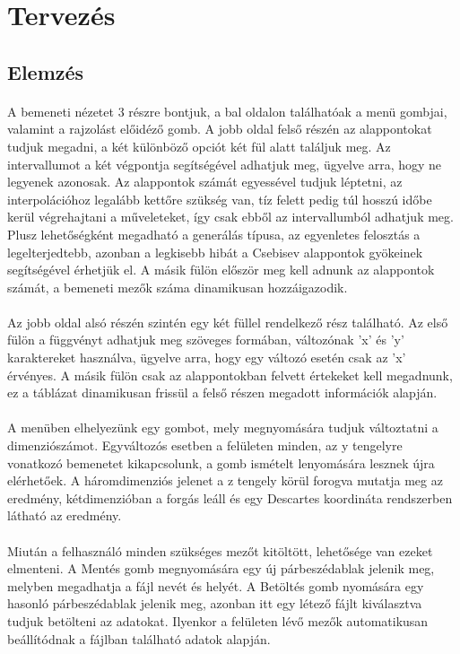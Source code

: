 \documentclass[12pt]{report}
\begin{document}
\section{Tervezés}
\subsection{Elemzés}
\paragraph{}
A bemeneti nézetet 3 részre bontjuk, a bal oldalon találhatóak a menü gombjai, valamint a rajzolást előidéző gomb. A jobb oldal felső részén az alappontokat tudjuk megadni, a két különböző opciót két fül alatt találjuk meg. Az intervallumot a két végpontja segítségével adhatjuk meg, ügyelve arra, hogy ne legyenek azonosak. Az alappontok számát egyessével tudjuk léptetni, az interpolációhoz legalább kettőre szükség van, tíz felett pedig túl hosszú időbe kerül végrehajtani a műveleteket, így csak ebből az intervallumból adhatjuk meg. Plusz lehetőségként megadható a generálás típusa, az egyenletes felosztás a legelterjedtebb, azonban a legkisebb hibát a Csebisev alappontok gyökeinek segítségével érhetjük el. A másik fülön először meg kell adnunk az alappontok számát, a bemeneti mezők száma dinamikusan hozzáigazodik.
\paragraph{}
Az jobb oldal alsó részén szintén egy két füllel rendelkező rész található. Az első fülön a függvényt adhatjuk meg szöveges formában, változónak 'x' és 'y' karaktereket használva, ügyelve arra, hogy egy változó esetén csak az 'x' érvényes. A másik fülön csak az alappontokban felvett értekeket kell megadnunk, ez a táblázat dinamikusan frissül a felső részen megadott információk alapján.
\paragraph{}
A menüben elhelyezünk egy gombot, mely megnyomására tudjuk változtatni a dimenziószámot. Egyváltozós esetben a felületen minden, az y tengelyre vonatkozó bemenetet kikapcsolunk, a gomb ismételt lenyomására lesznek újra elérhetőek. A háromdimenziós jelenet a z tengely körül forogva mutatja meg az eredmény, kétdimenzióban a forgás leáll és egy Descartes koordináta rendszerben látható az eredmény.
\paragraph{}
Miután a felhasználó minden szükséges mezőt kitöltött, lehetősége van ezeket elmenteni. A Mentés gomb megnyomására egy új párbeszédablak jelenik meg, melyben megadhatja a fájl nevét és helyét. A Betöltés gomb nyomására egy hasonló párbeszédablak jelenik meg, azonban itt egy létező fájlt kiválasztva tudjuk betölteni az adatokat. Ilyenkor a felületen lévő mezők automatikusan beállítódnak a fájlban található adatok alapján.
\end{document}

